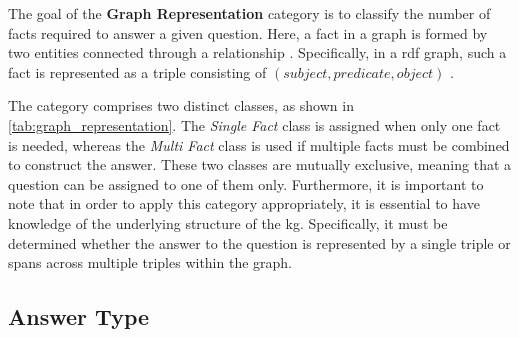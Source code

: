 The goal of the \textbf{Graph Representation} category is to classify the number of facts required to answer a given question. Here, a fact in a graph is formed by two entities connected through a relationship \cite{abu-salih_domain-specific_2021}. Specifically, in a \gls{rdf} graph, such a fact is represented as a triple consisting of $(subject, predicate, object)$ \cite{wood_rdf_2014}.

The category comprises two distinct classes, as shown in \autoref{tab:graph_representation}. The \emph{Single Fact} class is assigned when only one fact is needed, whereas the \emph{Multi Fact} class is used if multiple facts must be combined to construct the answer. These two classes are mutually exclusive, meaning that a question can be assigned to one of them only. Furthermore, it is important to note that in order to apply this category appropriately, it is essential to have knowledge of the underlying structure of the \gls{kg}. Specifically, it must be determined whether the answer to the question is represented by a single triple or spans across multiple triples within the graph.


\subsection{Answer Type}

